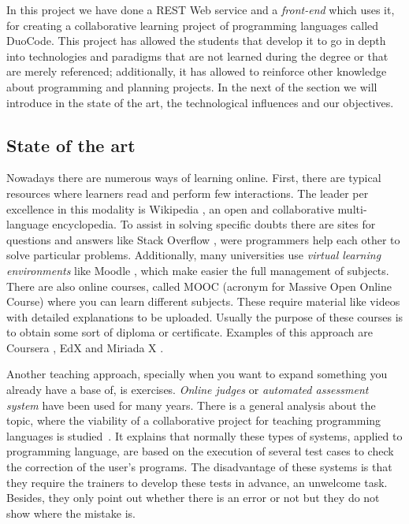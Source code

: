 
In this project we have done a REST Web service and a \emph{front-end} which uses it, for creating a collaborative learning project of programming languages called DuoCode. This project has allowed the students that develop it to go in depth into technologies and paradigms that are not learned during the degree or that are merely referenced; additionally, it has allowed to reinforce other knowledge about programming and planning projects. In the next of the section we will introduce in the state of the art, the technological influences and our objectives.

\subsection{State of the art\label{subsec:state_art}}

Nowadays there are numerous ways of learning online. First, there are typical resources where learners read and perform few interactions. The leader per excellence in this modality is Wikipedia \cite{wiki}, an open and collaborative multi-language encyclopedia. To assist in solving specific doubts there are sites for questions and answers like Stack Overflow \cite{stack}, were programmers help each other to solve particular problems. Additionally, many universities use \emph{virtual learning environments} like Moodle \cite{moodle}, which make easier the full management of subjects. There are also online courses, called MOOC (acronym for Massive Open Online Course) where you can learn different subjects. These require material like videos with detailed explanations to be uploaded. Usually the purpose of these courses is to obtain some sort of diploma or certificate. Examples of this approach are Coursera \cite{coursera}, EdX \cite{edX} and Miriada X \cite{miriadaX}.

Another teaching approach, specially when you want to expand something you already have a base of, is exercises. \emph{Online judges} or \emph{automated assessment system} have been used for many years. There is a general analysis about the topic, where the viability of a collaborative project for teaching programming languages is studied~\cite{pimcdDuoCode14}. It explains that normally these types of systems, applied to programming language, are based on the execution of several test cases to check the correction of the user's programs. The disadvantage of these systems is that they require the trainers to develop these tests in advance, an unwelcome task. Besides, they only point out whether there is an error or not but they do not show where the mistake is.

